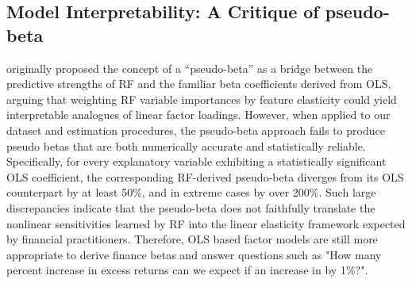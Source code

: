 \subsection{Model Interpretability: A Critique of pseudo-beta}





 originally proposed the concept of a “pseudo-beta” as a bridge between the predictive strengths of RF and the familiar beta coefficients derived from OLS, arguing that weighting RF variable importances by feature elasticity could yield interpretable analogues of linear factor loadings. However, when applied to our dataset and estimation procedures, the pseudo-beta approach fails to produce pseudo betas that are both numerically accurate and statistically reliable. Specifically, for every explanatory variable exhibiting a statistically significant OLS coefficient, the corresponding RF-derived pseudo-beta diverges from its OLS counterpart by at least 50\%, and in extreme cases by over 200\%. Such large discrepancies indicate that the pseudo-beta does not faithfully translate the nonlinear sensitivities learned by RF into the linear elasticity framework expected by financial practitioners. Therefore, OLS based factor models are still more appropriate to derive finance betas and answer questions such as "How many percent increase in excess returns can we expect if an increase in by 1\%?".

